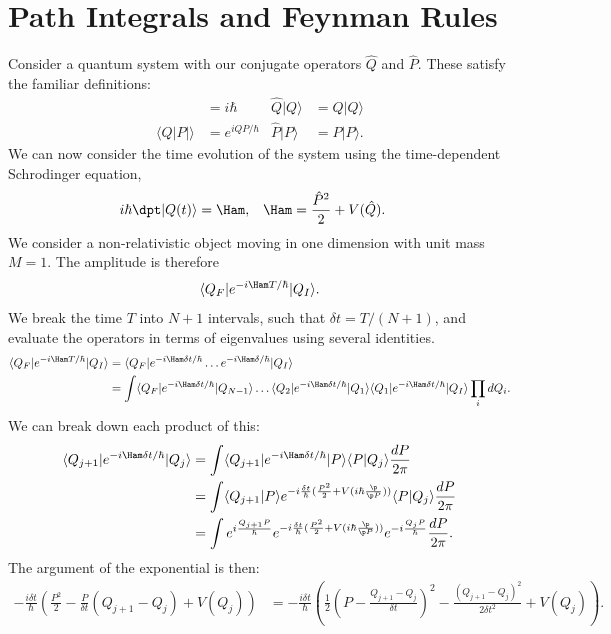\documentclass[a4paper, 11pt, normalem]{report}
\begin{document}
\chapter{Path Integrals and Feynman Rules}
Consider a quantum system with our conjugate operators $\hat{Q}$ and $\hat{P}$.
These satisfy the familiar definitions:
\begin{align}
    [\hat{Q},\hat{P}] &= i\hbar & \hat{Q}|Q\rangle &= Q|Q\rangle \\
    \langle Q|P|\rangle &= e^{iQP/\hbar} & \hat{P}|P\rangle &= P|P\rangle.
\end{align}
We can now consider the time evolution of the system using the time-dependent Schrodinger equation,
\begin{align}
    i\hbar\dpt|Q(t)\rangle &= \Ham, & \Ham &= \frac{\hat{P}^2}{2} + V(\hat{Q}).
\end{align}
We consider a non-relativistic object moving in one dimension with unit mass $M=1$.
The amplitude is therefore
\begin{align}
    \langle Q_F|e^{-i\Ham T/\hbar}|Q_I\rangle.
\end{align}
We break the time $T$ into $N+1$ intervals, such that $\delta t = T/(N+1)$, and evaluate the operators in terms of eigenvalues using several identities.
\begin{align}
    \langle Q_F|e^{-i\Ham T/\hbar}|Q_I\rangle &= \langle Q_F|e^{-i\Ham \delta t/\hbar}\dots e^{-i\Ham \delta/\hbar}|Q_I\rangle \\
                                              &= \int \langle Q_F|e^{-i\Ham \delta t/\hbar}|Q_{N-1}\rangle\dots\langle Q_2|e^{-i\Ham\delta t/\hbar}|Q_1\rangle\langle Q_1|e^{-i\Ham\delta t/\hbar}|Q_I\rangle\prod_i dQ_i.
\end{align}
We can break down each product of this:
\begin{align}
    \langle Q_{j+1}|e^{-i\Ham\delta t/\hbar}|Q_j\rangle &= \int \langle Q_{j+1}|e^{-i\Ham\delta t/\hbar}|P\rangle\langle P|Q_j\rangle\frac{dP}{2\pi} \\
                                                        &= \int \langle Q_{j+1}|P\rangle e^{-i\frac{\delta t}{\hbar}(\frac{P^2}{2}+V(i\hbar\frac{\p}{\p P}))}\langle P|Q_j\rangle\frac{dP}{2\pi} \\
    &= \int e^{i\frac{Q_{j+1}P}{\hbar}}e^{-i\frac{\delta t}{\hbar}(\frac{P^2}{2}+V(i\hbar\frac{\p}{\p P}))}e^{-i\frac{Q_jP}{\hbar}}\frac{dP}{2\pi}.
\end{align}
The argument of the exponential is then:
\begin{align}
    -\frac{i\delta t}{\hbar}\left(\frac{P^2}{2}-\frac{P}{\delta t}(Q_{j+1}-Q_j)+V(Q_j)\right) &= -\frac{i\delta t}{\hbar}\left(\frac12\left(P - \frac{Q_{j+1}-Q_j}{\delta t}\right)^2 - \frac{(Q_{j+1}-Q_j)^2}{2\delta t^2} + V(Q_j)\right).
\end{align}
\end{document}
